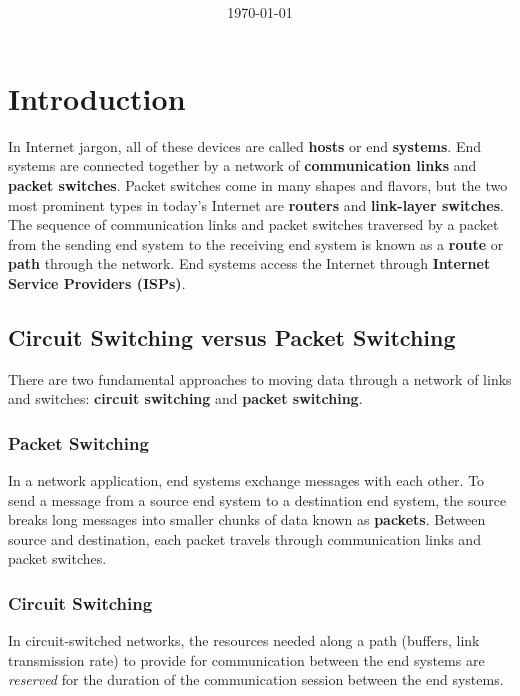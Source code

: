 \documentclass[11pt]{article}
\title{\textbf{\Topic}}
\author{\Name}
\date{\today}
\begin{document}
\maketitle
\tableofcontents
\newpage

\section{Introduction}

In Internet jargon, all of these devices are called \textbf{hosts} or end \textbf{systems}.
End systems are connected together by a network of \textbf{communication links} and \textbf{packet switches}.
Packet switches come in many shapes and flavors, but the two most prominent types in today’s Internet are \textbf{routers} and \textbf{link-layer switches}.
The sequence of communication links and packet switches traversed by a packet from the sending end system to the receiving end system is known as a \textbf{route} or \textbf{path} through the network.
End systems access the Internet through \textbf{Internet Service Providers (ISPs)}.

\subsection{Circuit Switching versus Packet Switching}

There are two fundamental approaches to moving data through a network of links and switches: \textbf{circuit switching} and \textbf{packet switching}. 

\subsubsection{Packet Switching}

In a network application, end systems exchange messages with each other. To send a message from a source end system to a destination end system, the source breaks long messages into smaller chunks of data known as \textbf{packets}. Between source and destination, each packet travels through communication links and packet switches.

\subsubsection{Circuit Switching}

In circuit-switched networks, the resources needed along a path (buffers, link transmission rate) to provide for communication between the end systems are \textit{reserved} for the duration of the communication session between the end systems.
\end{document}

